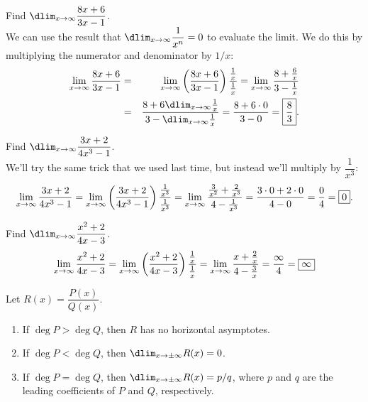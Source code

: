 \documentclass{book}
\begin{document}
\begin{Exam} Find $\dlim_{x\to \infty}\dfrac{8x+6}{3x-1}$.\\

We can use the result that $\dlim_{x\to \infty}\dfrac{1}{x^n}=0$ to evaluate the limit. We do this by multiplying the numerator and denominator by  $1/x$:
\begin{eqnarray*}
\lim_{x\to \infty}\dfrac{8x+6}{3x-1} &=& \lim_{x\to \infty}\left(\dfrac{8x + 6}{3x-1}\right)\dfrac{\frac{1}{x}}{\frac{1}{x}} = \lim_{x\to \infty}\dfrac{8 + \frac{6}{x}}{3-\frac{1}{x}}\\
&=& \dfrac{8+6\dlim_{x\to \infty}\frac{1}{x}}{3-\dlim_{x\to\infty}\frac{1}{x}} = \dfrac{8+6\cdot 0}{3-0}  = \fbox{$\dfrac{8}{3}$}.
\end{eqnarray*}
\end{Exam}\vs

\begin{Exam} Find $\dlim_{x\to \infty} \dfrac{3x+2}{4x^3-1}$.\\

We'll try the same trick that we used last time, but instead we'll multiply by $\dfrac{1}{x^3}$:
\[\lim_{x\to \infty} \dfrac{3x+2}{4x^3-1} = \lim_{x\to \infty} \left(\dfrac{3x+2}{4x^3-1}\right)\dfrac{\frac{1}{x^3}}{\frac{1}{x^3}} = \lim_{x\to \infty} \dfrac{\frac{3}{x^2} + \frac{2}{x^3}}{4-\frac{1}{x^3}} = \dfrac{3\cdot 0 + 2\cdot 0}{4 - 0} = \dfrac{0}{4} = \fbox{$0$}.\]
 \end{Exam}\vs

\begin{Exam} Find $\dlim_{x\to \infty}\dfrac{x^2+2}{4x-3}$.
\[\lim_{x\to \infty}\dfrac{x^2+2}{4x-3} = \lim_{x\to \infty}\left(\dfrac{x^2+2}{4x-3}\right)\dfrac{\frac{1}{x}}{\frac{1}{x}} = \lim_{x\to \infty}\dfrac{x+\frac{2}{x}}{4-\frac{3}{x}} = \dfrac{\infty}{4} = \fbox{$\infty$}\]
\end{Exam}\vs

\begin{Thm} Let $R(x) = \dfrac{P(x)}{Q(x)}$.
\begin{enumerate}
\item If $\deg P > \deg Q$, then $R$ has no horizontal asymptotes.
\item If $\deg P < \deg Q$, then $\dlim_{x\to \pm\infty} R(x) = 0$.
\item If  $\deg P = \deg Q$, then $\dlim_{x\to \pm\infty} R(x) = p/q$, where $p$ and $q$ are the leading coefficients of $P$ and $Q$, respectively.
\end{enumerate}
\end{Thm}\vs
\end{document}
